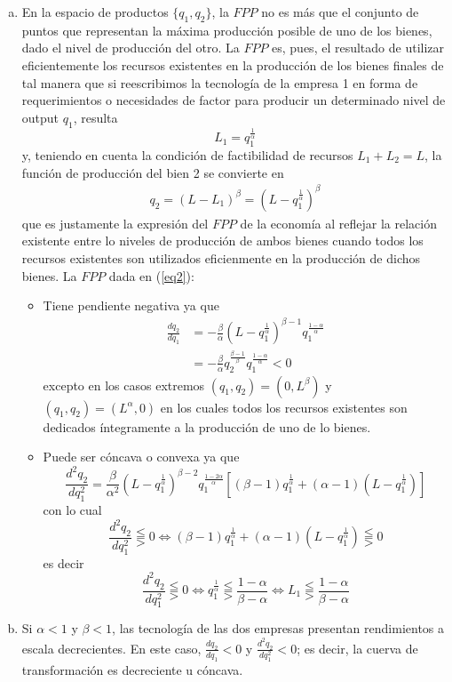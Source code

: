 \begin{enumerate}[a)]
	\item En la espacio de productos $\{q_1, q_2\}$, la $FPP$ no es más que el conjunto de puntos que representan la máxima producción posible de uno de los bienes, dado el nivel de producción del otro. La $FPP$ es, pues, el resultado de utilizar eficientemente los recursos existentes en la producción de los bienes finales de tal manera que si reescribimos la tecnología de la empresa 1 en forma de requerimientos o necesidades de factor para producir un determinado nivel de output $q_1$, resulta
		$$L_1 = q_{1}^{\frac{1}{\alpha}}$$
	y, teniendo en cuenta la condición de factibilidad de recursos $L_1 + L_2 = L$, la función de producción del bien 2 se convierte en 
		\begin{gather}
			q_2 = (L - L_{1})^\beta = \left( L - q_{1}^{\frac{1}{\alpha}}\right)^{\beta} \label{eq2}
		\end{gather}
	que es justamente la expresión del $FPP$ de la economía al reflejar la relación existente entre lo niveles de producción de ambos bienes cuando todos los recursos existentes son utilizados eficienmente en la producción de dichos bienes. La $FPP$ dada en (\ref{eq2}):
		\begin{itemize}
			\item Tiene pendiente negativa ya que
						\begin{align*}
							\frac{dq_2}{dq_1} & = -\frac{\beta}{\alpha} \left( L - q_{1}^{\frac{1}{\alpha}}\right)^{\beta - 1}q_{1}^{\frac{1 - \alpha}{\alpha}}\\
											  & = -\frac{\beta}{\alpha}q_{2}^{\frac{\beta - 1}{\beta}}q_{1}^{\frac{1 - \alpha}{\alpha}} < 0
						\end{align*}
					excepto en los casos extremos $(q_1,q_2) = (0,L^{\beta})$ y $(q_1,q_2) = (L^{\alpha},0)$ en los cuales todos los recursos existentes son dedicados íntegramente a la producción de uno de lo bienes.
			\item Puede ser cóncava o convexa ya que 
						$$\frac{d^2q_2}{dq_{1}^2} = \frac{\beta}{\alpha^2}\left( L - q_{1}^{\frac{1}{\alpha}}\right)^{\beta - 2}q_{1}^{\frac{1 - 2\alpha}{\alpha}}\left[(\beta - 1)q_{1}^{\frac{1}{\alpha}} + (\alpha - 1) \left( L - q_{1}^{\frac{1}{\alpha}}\right)\right]$$
					con lo cual
						$$\frac{d^2q_2}{dq_{1}^2} \lesseqqgtr 0 \Leftrightarrow (\beta - 1)q_{1}^{\frac{1}{\alpha}} + (\alpha - 1) \left( L - q_{1}^{\frac{1}{\alpha}}\right) \lesseqqgtr 0$$
					es decir
						$$\frac{d^2q_2}{dq_{1}^2} \lesseqqgtr 0 \Leftrightarrow q_{1}^{\frac{1}{\alpha}} \lesseqqgtr \frac{1-\alpha}{\beta -\alpha} \Leftrightarrow L_1 \lesseqqgtr \frac{1-\alpha}{\beta -\alpha}$$
		\end{itemize}
	\item Si $\alpha < 1$ y $\beta < 1$, las tecnología de las dos empresas presentan rendimientos a escala decrecientes. En este caso, $\frac{dq_2}{dq_1} < 0$ y $\frac{d^2q_2}{dq_{1}^2} < 0$; es decir, la cuerva de transformación es decreciente u cóncava.\\
	

\end{enumerate}
